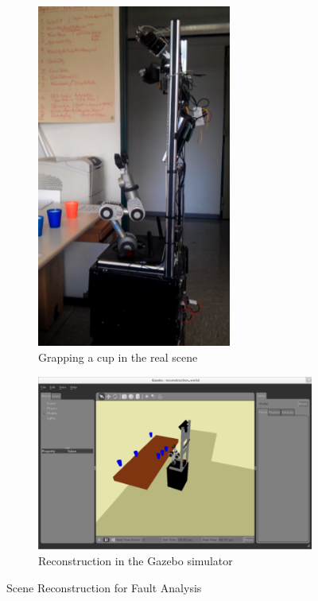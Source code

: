 \begin{figure}
  \centering
  \begin{subfigure}[b]{0.38\textwidth}
    \includegraphics[width=0.7\textwidth]{pics/klingen_real}
    \caption{Grapping a cup in the real scene}
    \label{fig:klingen_real}
  \end{subfigure}
  \begin{subfigure}[b]{0.58\textwidth}
    \includegraphics[width=\textwidth]{pics/klingen_sim}
    \caption{Reconstruction in the Gazebo simulator}
    \label{fig:klingen_sim}
  \end{subfigure}
  \caption{Scene Reconstruction for Fault Analysis~\cite{KlingenDA}}
  \label{fig:klingen}
\end{figure}
